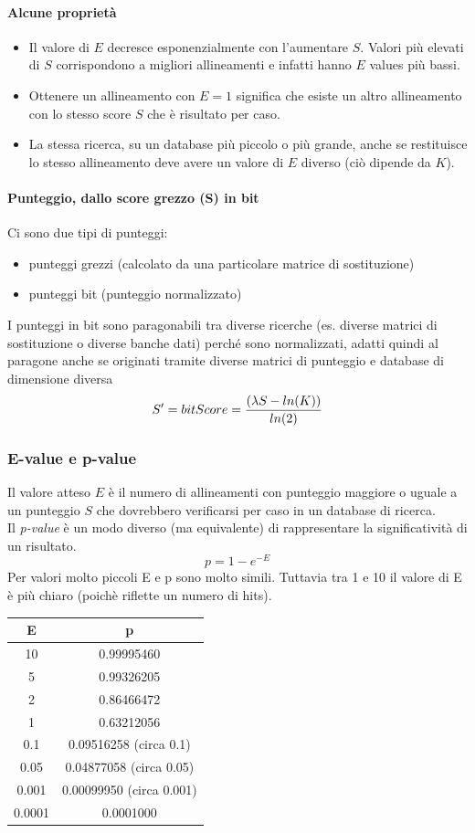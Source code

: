 \documentclass{article}
\begin{document}
\paragraph{Alcune proprietà}
\begin{itemize}
    \item Il valore di $E$ decresce esponenzialmente con l'aumentare $S$.
    Valori più elevati di $S$ corrispondono a migliori allineamenti e
    infatti hanno $E$ values più bassi.
    \item Ottenere un allineamento con $E = 1$ significa che esiste un
    altro allineamento con lo stesso score $S$ che è risultato per
    caso.
    \item La stessa ricerca, su un database più piccolo o più grande,
    anche se restituisce lo stesso allineamento deve avere un
    valore di $E$ diverso (ciò dipende da $K$).
\end{itemize}
\paragraph{Punteggio, dallo score grezzo (S) in bit}
Ci sono due tipi di punteggi:
\begin{itemize}
    \item punteggi grezzi (calcolato da una particolare matrice di
    sostituzione)
    \item punteggi bit (punteggio normalizzato)
\end{itemize}
I punteggi in bit sono paragonabili tra diverse ricerche
(es. diverse matrici di sostituzione o diverse banche dati)
perché sono normalizzati, adatti quindi al paragone anche se
originati tramite diverse matrici di punteggio e database di
dimensione diversa
$$ S' = bitScore = {(\lambda S - ln(K))\over ln(2)} $$
\subsubsection{E-value e p-value}
Il valore atteso $E$ è il numero di allineamenti con punteggio
maggiore o uguale a un punteggio $S$ che dovrebbero verificarsi
per caso in un database di ricerca.\\
Il \textit{p-value} è un modo diverso (ma equivalente) di rappresentare
la significatività di un risultato.
$$ p = 1 -e^{-E}$$
Per valori molto piccoli E e p sono molto simili. Tuttavia tra 1 e
10 il valore di E è più chiaro (poichè riflette un numero di hits).
\begin{center}
    \begin{tabular}{c|c}
        E & p \\
        \midrule
        10 & 0.99995460\\
        5 & 0.99326205\\
        2 & 0.86466472\\
        1 & 0.63212056\\
        0.1 & 0.09516258 (circa 0.1)\\
        0.05 & 0.04877058 (circa 0.05)\\
        0.001 & 0.00099950 (circa 0.001)\\
        0.0001 & 0.0001000\\
    \end{tabular}
\end{center}
\end{document}
